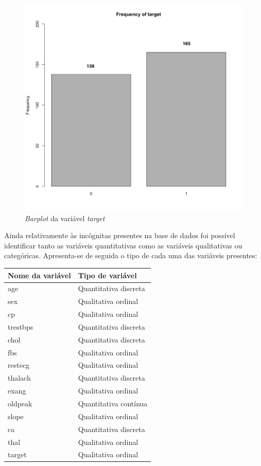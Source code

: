 \documentclass[a4paper]{report}
\begin{document}
{\begin{itemize}
		\begin{figure}[h!]
			\centering
			\includegraphics[scale=0.4]{images/barplot.png}
			\caption{\textit{Barplot} da variável \textit{target}}
			\label{fig:barplot}
		\end{figure}

    \end{itemize}
	
	Ainda relativamente às incógnitas presentes na base de dados foi possível identificar tanto as variáveis quantitativas como as variáveis qualitativas ou categóricas. 
	Apresenta-se de seguida o tipo de cada uma das variáveis presentes:
	\begin{center}
		\begin{tabular}{ | l | l | }
		\hline
		\textbf{Nome da variável} & \textbf{Tipo de variável} \\ \hline
		age & Quantitativa discreta \\ \hline
		sex & Qualitativa ordinal \\ \hline
		cp & Qualitativa ordinal \\ \hline
		trestbps & Quantitativa discreta \\ \hline
		chol & Quantitativa discreta \\ \hline
		fbs & Qualitativa ordinal \\ \hline
		restecg & Qualitativa ordinal \\ \hline
		thalach & Quantitativa discreta \\ \hline
		exang & Qualitativa ordinal \\ \hline
		oldpeak & Quantitativa contínua \\ \hline
		slope & Qualitativa ordinal \\ \hline
		ca & Quantitativa discreta \\ \hline
		thal & Qualitativa ordinal \\ \hline
		target & Qualitativa ordinal \\ \hline
		\end{tabular}
	\end{center}
	
}
\end{document}
